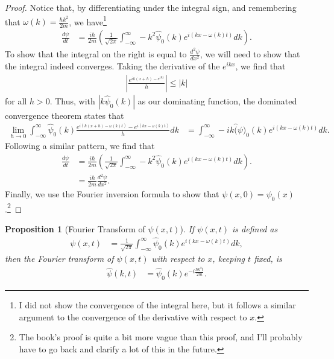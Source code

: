 \documentclass[10pt]{extarticle}
\theoremstyle{plain}
\newtheorem*{proposition}{Proposition}%
\theoremstyle{definition}
\theoremstyle{remark}
\begin{document}
  \begin{proof}
    Notice that, by differentiating under the integral sign, and remembering that $\omega(k) = \frac{\hbar k^2}{2m}$, we have\footnote{I did not show the convergence of the integral here, but it follows a similar argument to the convergence of the derivative with respect to $x$.}
    \begin{align*}
      \frac{d\psi}{dt} &= \frac{i\hbar}{2m}\left(\frac{1}{\sqrt{2\pi}}\int_{-\infty}^{\infty}-k^2\hat{\psi}_0(k)e^{i(kx - \omega(k)t)}dk\right).
    \end{align*}
    To show that the integral on the right is equal to $\frac{d^2\psi}{dx^2}$, we will need to show that the integral indeed converges. Taking the derivative of the $e^{ikx}$, we find that
    \begin{align*}
      \left\vert \frac{e^{ik(x+h)-e^{ikx}}}{h} \right\vert\leq |k|
    \end{align*}
    for all $h > 0$. Thus, with $|k\hat{\psi}_0(k)|$ as our dominating function, the dominated convergence theorem states that
    \begin{align*}
      \lim_{h\rightarrow 0}\int_{-\infty}^{\infty}\hat{\psi}_0(k)\frac{e^{i\left(k(x+h) - \omega(k)t\right)} - e^{i(kx - \omega(k)t)}}{h}dk &= \int_{-\infty}^{\infty}-ik\hat(\psi)_0(k)e^{i\left(kx - \omega(k)t\right)}dk.
    \end{align*}
    Following a similar pattern, we find that
    \begin{align*}
      \frac{d\psi}{dt} &= \frac{i\hbar}{2m}\left(\frac{1}{\sqrt{2\pi}}\int_{-\infty}^{\infty}-k^2\hat{\psi}_0(k)e^{i(kx - \omega(k)t)}dk\right).\\
                       &= \frac{i\hbar}{2m}\frac{d^2\psi}{dx^2}.
    \end{align*}
    Finally, we use the Fourier inversion formula to show that $\psi(x,0) = \psi_0(x)$.\footnote{The book's proof is quite a bit more vague than this proof, and I'll probably have to go back and clarify a lot of this in the future.}
  \end{proof}
  \begin{proposition}[Fourier Transform of $\psi(x,t)$]
    If $\psi(x,t)$ is defined as
    \begin{align*}
      \psi(x,t) &= \frac{1}{\sqrt{2\pi}}\int_{-\infty}^{\infty}\hat{\psi}_0(k)e^{i(kx - \omega(k)t)}dk,
    \end{align*}
    then the Fourier transform of $\psi(x,t)$ with respect to $x$, keeping $t$ fixed, is
    \begin{align*}
      \hat{\psi}(k,t) &= \hat{\psi}_0(k)e^{-i\frac{\hbar k^2 t}{2m}}.
    \end{align*}
  \end{proposition}
\end{document}

